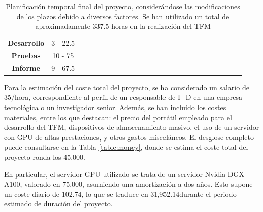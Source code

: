 \begin{table}[h]
{\begin{tabular}{|c|c|ccccccccccccccccccccccc}
    \textbf{Desarrollo} & 3 - 22.5 & \cellcolor[HTML]{FFCCC9} &  & \cellcolor[HTML]{FFCCC9} &  & \cellcolor[HTML]{FFCCC9} &  &  &  &  &  &  &  &  &  &  &  &  &  &  &  &  & \multicolumn{1}{c|}{} &  \\ \cline{1-24}
    \textbf{Pruebas} & 10 - 75 &  & \cellcolor[HTML]{FFCCC9} &  & \cellcolor[HTML]{FFCCC9} &  & \cellcolor[HTML]{FFCCC9} & \cellcolor[HTML]{FFCCC9} & \cellcolor[HTML]{FFCCC9} & \cellcolor[HTML]{FFCCC9} & \cellcolor[HTML]{FFCCC9} & \cellcolor[HTML]{FFCCC9} & \cellcolor[HTML]{FFCCC9} & \cellcolor[HTML]{FFCCC9} &  &  &  &  &  &  &  &  & \multicolumn{1}{c|}{} &  \\ \cline{1-24}
    \textbf{Informe} & 9 - 67.5 &  &  &  &  &  &  &  &  &  &  &  &  &  & \cellcolor[HTML]{FFCCC9} & \cellcolor[HTML]{FFCCC9} & \cellcolor[HTML]{FFCCC9} & \cellcolor[HTML]{FFCCC9} & \cellcolor[HTML]{FFCCC9} & \cellcolor[HTML]{FFCCC9} & \cellcolor[HTML]{FFCCC9} & \cellcolor[HTML]{FFCCC9} & \multicolumn{1}{c|}{\cellcolor[HTML]{FFCCC9}} &  \\ \cline{1-24}
\end{tabular}%
}
\caption[Planificación temporal final del proyecto]{Planificación temporal final del proyecto, considerándose las modificaciones de los plazos debido a diversos factores. Se han utilizado un total de aproximadamente 337.5 horas en la realización del TFM}
\label{table:plan2}
\end{table}

Para la estimación del coste total del proyecto, se ha considerado un salario de 35\officialeuro/hora, correspondiente al perfil de un responsable de I+D en una empresa tecnológica o un investigador senior. Además, se han incluido los costes materiales, entre los que destacan: el precio del portátil empleado para el desarrollo del TFM, dispositivos de almacenamiento masivo, el uso de un servidor con GPU de altas prestaciones, y otros gastos misceláneos. El desglose completo puede consultarse en la Tabla \ref{table:money}, donde se estima el coste total del proyecto ronda los 45,000\officialeuro.

En particular, el servidor GPU utilizado se trata de un servidor Nvidia DGX A100, valorado en 75,000\officialeuro, asumiendo una amortización a dos años. Esto supone un coste diario de 102.74\officialeuro, lo que se traduce en 31,952.14\officialeuro\space durante el periodo estimado de duración del proyecto.

